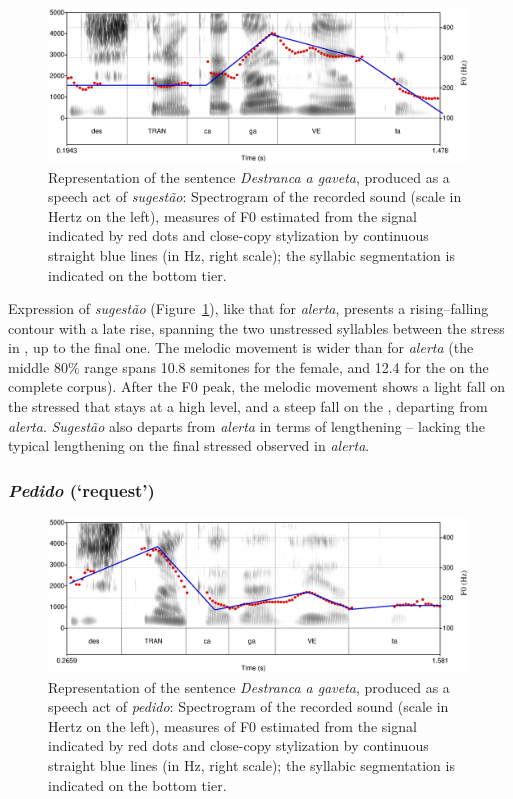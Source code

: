 \documentclass[output=paper]{LSP/langsci}
\begin{document}
\begin{figure}

\includegraphics[width=0.99\textwidth]{figures/MOR8.eps}
\caption{Representation of the sentence \textit{Destranca a gaveta}, produced as a speech act of \textit{sugestão}: Spectrogram of the recorded sound (scale in Hertz on the left), measures of F0 estimated from the signal indicated by red dots and close-copy stylization by continuous straight blue lines (in Hz, right scale); the syllabic segmentation is indicated on the bottom tier.}
\label{figure:CC6}
\end{figure}

Expression of \textit{sugestão} (Figure~\ref{figure:CC6}), like that for \textit{alerta}, presents a rising–falling contour with a late rise, spanning the two unstressed syllables between the stress in , up to the final one. 
The melodic movement is wider than for \textit{alerta} (the middle 80\% range spans 10.8 semitones for the female, and 12.4 for the  on the complete corpus). 
After the F0 peak, the melodic movement shows a light fall on the stressed  that stays at a high level, and a steep fall on the , departing from \textit{alerta}. 
\textit{Sugestão} also departs from \textit{alerta} in terms of lengthening -- lacking the typical lengthening  on the final stressed  observed in \textit{alerta}.


\subsubsection{\textit{Pedido} (`request')}

\begin{figure}

\includegraphics[width=0.99\textwidth]{figures/MOR9.eps}
\caption{Representation of the sentence \textit{Destranca a gaveta}, produced as a speech act of \textit{pedido}: Spectrogram of the recorded sound (scale in Hertz on the left), measures of F0 estimated from the signal indicated by red dots and close-copy stylization by continuous straight blue lines (in Hz, right scale); the syllabic segmentation is indicated on the bottom tier.}
\label{figure:CC7}
\end{figure}
\end{document}

